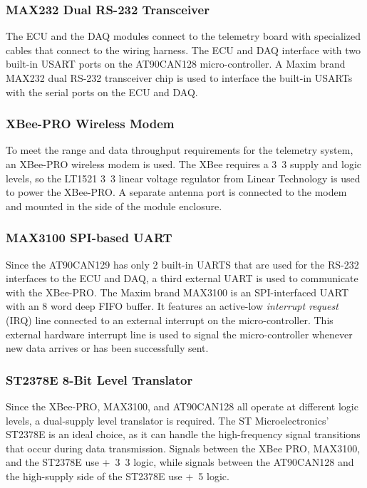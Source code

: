 \subsubsection{MAX232 Dual RS-232 Transceiver}

The ECU and the DAQ modules connect to the telemetry board with specialized cables that connect to the wiring harness. The ECU and DAQ interface with two built-in USART ports on the AT90CAN128 micro-controller. A Maxim brand MAX232 dual RS-232 transceiver chip is used to interface the built-in USARTs with the serial ports on the ECU and DAQ.

\subsubsection{XBee-PRO Wireless Modem}

To meet the range and data throughput requirements for the telemetry system, an XBee-PRO wireless modem is used. The XBee requires a \unit{3.3}{\volt} supply and logic levels, so the LT1521 \unit{3.3}{\volt} linear voltage regulator from Linear Technology is used to power the XBee-PRO. A separate antenna port is connected to the modem and mounted in the side of the module enclosure.

\subsubsection{MAX3100 SPI-based UART}

Since the AT90CAN129 has only 2 built-in UARTS that are used for the RS-232 interfaces to the ECU and DAQ, a third external UART is used to communicate with the XBee-PRO. The Maxim brand MAX3100 is an SPI-interfaced UART with an 8 word deep FIFO buffer. It features an active-low \emph{interrupt request} (IRQ) line connected to an external interrupt on the micro-controller. This external hardware interrupt line is used to signal the micro-controller whenever new data arrives or has been successfully sent.

\subsubsection{ST2378E 8-Bit Level Translator}

Since the XBee-PRO, MAX3100, and AT90CAN128 all operate at different logic levels, a dual-supply level translator is required. The ST Microelectronics' ST2378E is an ideal choice, as it can handle the high-frequency signal transitions that occur during data transmission. Signals between the XBee PRO, MAX3100, and the ST2378E use \unit{+3.3}{\volt} logic, while signals between the AT90CAN128 and the high-supply side of the ST2378E use \unit{+5}{\volt} logic.

